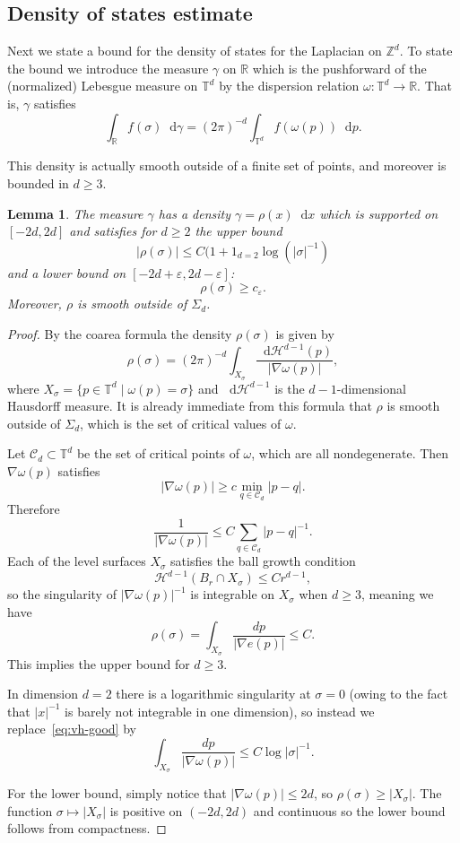 \documentclass[11pt]{amsart}
\def\Real{{\mathbb R}}
\def\bbZ{{\mathbb Z}}
\def\Torus{{\mathbb T}}
\def\eps{{\varepsilon}}
\newcommand{\diff}{\mathop{}\!\mathrm{d}}
\newcommand{\mcal}[1]{{\mathcal{#1}}}
\numberwithin{equation}{section}
\numberwithin{theorem}{section}
\newtheorem{lemma}[theorem]{Lemma}
\begin{document}
\subsection{Density of states estimate}

Next we state a bound for the density of states for the Laplacian on $\bbZ^d$.  To state the bound we
introduce the measure $\gamma$ on $\Real$ which is the pushforward of the (normalized)
Lebesgue measure on $\Torus^d$
by the dispersion relation $\omega:\Torus^d \to\Real$.  That is, $\gamma$ satisfies
\[
\int_{\mathbb{R}} f(\sigma) \diff\gamma= (2\pi)^{-d} \int_{\Torus^d} f(\omega(p)) \diff p.
\]

This density is actually smooth outside of a finite set of points, and moreover is bounded in $d\geq 3$.
\begin{lemma}
\label{lem:free-dos}
The measure $\gamma$ has a density $\gamma = \rho(x)\diff x$ which is supported on $[-2d,2d]$ and
satisfies for $d\geq 2$ the upper bound
\[
|\rho(\sigma)| \leq C (1 + 1_{d=2}\log(|\sigma|^{-1})
\]
and a lower bound on $[-2d+\eps,2d-\eps]$:
\[
\rho(\sigma) \geq c_\eps.
\]
Moreover, $\rho$ is smooth outside of $\Sigma_d$.
\end{lemma}


\begin{proof}
By the coarea formula the density $\rho(\sigma)$ is given by
\[
\rho(\sigma) = (2\pi)^{-d} \int_{X_\sigma} \frac{\diff \mcal{H}^{d-1}(p)}{|\nabla \omega(p)|},
\]
where $X_\sigma = \{p\in\Torus^d \mid \omega(p)=\sigma\}$ and $\diff\mcal{H}^{d-1}$ is the $d-1$-dimensional
Hausdorff measure.  It is already immediate from this formula that $\rho$ is smooth outside of $\Sigma_d$,
which is the set of critical values of $\omega$.

Let $\mcal{C}_d\subset\Torus^d$ be the set of critical points of $\omega$, which are
all nondegenerate.  Then $\nabla \omega(p)$ satisfies
\[
|\nabla \omega(p)| \geq c \min_{q\in\mcal{C}_d} |p-q|.
\]
Therefore
\[
\frac{1}{|\nabla \omega(p)|} \leq C \sum_{q\in\mcal{C}_d} |p-q|^{-1}.
\]
Each of the level surfaces $X_\sigma$ satisfies the ball growth condition
\[
\mcal{H}^{d-1}(B_r \cap X_\sigma) \leq Cr^{d-1},
\]
so the singularity of $|\nabla \omega(p)|^{-1}$ is integrable on $X_\sigma$ when $d\geq 3$, meaning we have
\begin{equation}
\label{eq:vh-good}
\rho(\sigma) = \int_{X_\sigma} \frac{dp}{|\nabla e(p)|} \leq C.
\end{equation}
This implies the upper bound for $d\geq 3$.

In dimension $d=2$ there is a logarithmic singularity at $\sigma=0$ (owing to the fact that $|x|^{-1}$ is barely not integrable in one dimension), so instead we replace~\eqref{eq:vh-good} by
\[
\int_{X_\sigma} \frac{dp}{|\nabla \omega(p)|} \leq C \log |\sigma|^{-1}.
\]

For the lower bound, simply notice that $|\nabla \omega(p)| \leq 2d$, so $\rho(\sigma) \geq |X_\sigma|$.
The function $\sigma\mapsto |X_\sigma|$ is positive on $(-2d,2d)$ and continuous so the lower bound follows
from compactness.
\end{proof}
\end{document}
